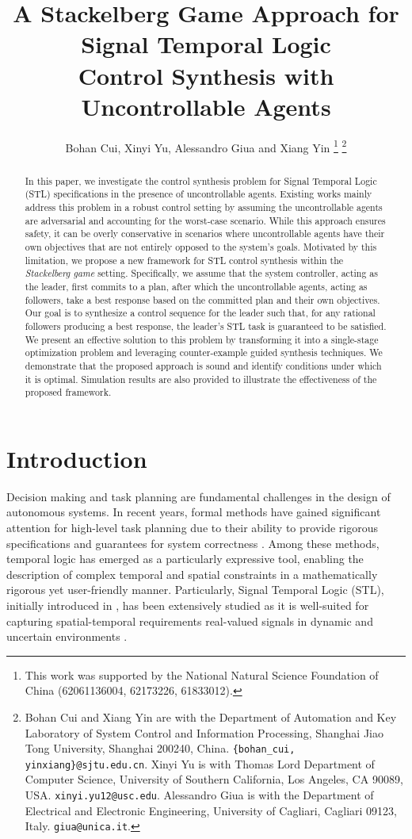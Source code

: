 \documentclass[letterpaper, 10 pt, conference]{ieeeconf}
\title{\bf A Stackelberg Game Approach for Signal Temporal Logic \\ Control Synthesis with Uncontrollable Agents}
\author{Bohan Cui, Xinyi Yu, Alessandro Giua and Xiang Yin%
\thanks{This work was supported by  the National Natural Science Foundation of China (62061136004, 62173226, 61833012).}
	\thanks{Bohan Cui and Xiang Yin are with the Department of Automation and Key Laboratory of System Control and Information Processing, Shanghai Jiao Tong University, Shanghai 200240, China.
	{\tt\small \{bohan\_cui,  yinxiang\}@sjtu.edu.cn}. 
	Xinyi Yu is with Thomas Lord Department of Computer Science, University of Southern California, Los Angeles, CA 90089, USA.
	{\tt\small xinyi.yu12@usc.edu}.     
	Alessandro Giua is with the Department of Electrical and Electronic Engineering, 
    University of Cagliari, Cagliari 09123, Italy.
	{\tt\small giua@unica.it}.
	} 
}
\begin{document}
\maketitle
\thispagestyle{empty}
\pagestyle{empty}
\setlength{\abovecaptionskip}{0pt}
\setlength{\belowcaptionskip}{3pt}
\setlength{\textfloatsep}{6pt}



\begin{abstract}
In this paper, we investigate the control synthesis problem for Signal Temporal Logic (STL) specifications in the presence of uncontrollable agents. Existing works mainly address this problem in a robust control setting by assuming the uncontrollable agents are adversarial and accounting for the worst-case scenario. While this approach ensures safety, it can be overly conservative in scenarios where uncontrollable agents have their own objectives that are not entirely opposed to the system's goals. Motivated by this limitation, we propose a new framework for STL control synthesis within the \emph{Stackelberg game} setting. Specifically, we assume that the system controller, acting as the leader, first commits to a plan, after which the uncontrollable agents, acting as followers, take a best response based on the committed plan and their own objectives. Our goal is to synthesize a control sequence for the leader such that, for any rational followers producing a best response, the leader's STL task is guaranteed to be satisfied. We present an effective solution to this problem by transforming it into a single-stage optimization problem and leveraging counter-example guided synthesis techniques. We demonstrate that the proposed approach is sound and identify conditions under which it is optimal. Simulation results are also provided to illustrate the effectiveness  of the proposed framework.
\end{abstract}

\section{Introduction}

Decision making and task planning are fundamental challenges in the design of autonomous systems. In recent years, formal methods have gained significant attention for high-level task planning due to their ability to provide rigorous specifications and guarantees for system correctness  \cite{kress2018synthesis,belta2019formal,yin2024formal}.  Among these methods, temporal logic has emerged as a particularly expressive tool, enabling the description of complex temporal and spatial constraints in a mathematically rigorous yet user-friendly manner.  Particularly, Signal Temporal Logic (STL), initially introduced in \cite{maler2004monitoring},  has been extensively studied as it is well-suited for capturing spatial-temporal requirements  real-valued signals in dynamic and uncertain environments \cite{ma2020sastl, ma2020stlnet, silano2021power}.
\end{document}
